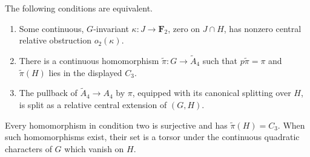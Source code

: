 \begin{proposition}\label{prop:163-binary-tetrahedral-lift}
The following conditions are equivalent.
\begin{enumerate}
\item Some continuous, \(G\)-invariant
\(\kappa:J\to\mathbf F_2\), zero on \(J\cap H\), has
nonzero central relative obstruction \(o_2(\kappa)\).
\item There is a continuous homomorphism
\(\widetilde\pi:G\to\widetilde A_4\) such that
\(p\widetilde\pi=\pi\) and
\(\widetilde\pi(H)\) lies in the displayed \(C_3\).
\item The pullback of
\(\widetilde A_4\to A_4\) by \(\pi\), equipped with its
canonical splitting over \(H\), is split as a relative central
extension of \((G,H)\).
\end{enumerate}
Every homomorphism in condition two is surjective and has
\(\widetilde\pi(H)=C_3\).  When such homomorphisms exist, their
set is a torsor under the continuous quadratic characters of \(G\)
which vanish on \(H\).
\end{proposition}

